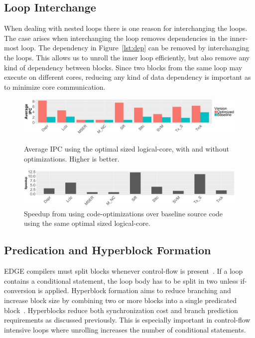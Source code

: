 \subsection{Loop Interchange}
When dealing with nested loops there is one reason for interchanging the loops.
The case arises when interchanging the loop removes dependencies in the inner-most loop.
The dependency in Figure~\ref{lst:dep} can be removed by interchanging the loops. 
This allows us to unroll the inner loop efficiently, but also remove any kind of dependency between blocks.
Since two blocks from the same loop may execute on different cores, reducing any kind of data dependency is important as to minimize core communication.

\begin{figure}[t]
     \centering
     \includegraphics[width=\textwidth]{cases-paper/graphics/Exploration/ipc_comp.pdf}
\vspace*{-8mm}
     \caption{Average IPC using the optimal sized logical-core, with and without optimizations. Higher is better.}
     \label{fig:ipccom}
     \vspace{0.5em}
\vspace{5mm}
    \centering
    \includegraphics[width=\textwidth]{cases-paper/graphics/Exploration/comp_speed.pdf}
\vspace*{-8mm}
    \caption{Speedup from using code-optimizations over baseline source code using the same optimal sized logical-core.}
    \label{fig:speedcomp}
\vspace{5mm}
\end{figure}

\subsection{Predication and Hyperblock Formation}
EDGE compilers must split blocks whenever control-flow is present~\cite{smith2006edge}.
If a loop contains a conditional statement, the loop body has to be split in two unless if-conversion is applied.
Hyperblock formation aims to reduce branching and increase block size by combining two or more blocks into a single predicated block~\cite{smith2006edge}.
Hyperblocks reduce both synchronization cost and branch prediction requirements as discussed previously.
This is especially important in control-flow intensive loops where unrolling increases the number of conditional statements.

